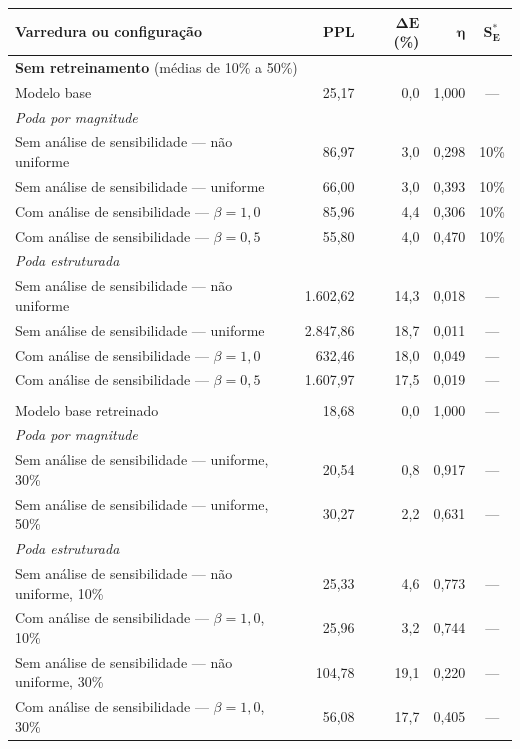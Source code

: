 \begin{tabular}{l r r r c}
\hline
\textbf{Varredura ou configuração} & \textbf{PPL} & $\boldsymbol{\Delta E}$ \textbf{(\%)} & $\boldsymbol{\eta}$ & $\boldsymbol{S^*_E}$ \\
\hline
\multicolumn{5}{l}{\textbf{Sem retreinamento} (médias de 10\% a 50\%)} \\
Modelo base & 25,17 & 0,0 & 1,000 & --- \\
\multicolumn{5}{l}{\quad\textit{Poda por magnitude}} \\
\qquad Sem análise de sensibilidade --- não uniforme & 86,97 & 3,0 & 0,298 & 10\% \\
\qquad Sem análise de sensibilidade --- uniforme & 66,00 & 3,0 & 0,393 & 10\% \\
\qquad Com análise de sensibilidade --- $\beta = 1{,}0$ & 85,96 & 4,4 & 0,306 & 10\% \\
\qquad Com análise de sensibilidade --- $\beta = 0{,}5$ & 55,80 & 4,0 & 0,470 & 10\% \\
\multicolumn{5}{l}{\quad\textit{Poda estruturada}} \\
\qquad Sem análise de sensibilidade --- não uniforme & 1.602,62 & 14,3 & 0,018 & --- \\
\qquad Sem análise de sensibilidade --- uniforme & 2.847,86 & 18,7 & 0,011 & --- \\
\qquad Com análise de sensibilidade --- $\beta = 1{,}0$ & 632,46 & 18,0 & 0,049 & --- \\
\qquad Com análise de sensibilidade --- $\beta = 0{,}5$ & 1.607,97 & 17,5 & 0,019 & --- \\
\addlinespace
\multicolumn{5}{l}{\textbf{Após o \textit{fine-tuning} de recuperação}} \\
Modelo base retreinado & 18,68 & 0,0 & 1,000 & --- \\
\multicolumn{5}{l}{\quad\textit{Poda por magnitude}} \\
\qquad Sem análise de sensibilidade --- uniforme, 30\% & 20,54 & 0,8 & 0,917 & --- \\
\qquad Sem análise de sensibilidade --- uniforme, 50\% & 30,27 & 2,2 & 0,631 & --- \\
\multicolumn{5}{l}{\quad\textit{Poda estruturada}} \\
\qquad Sem análise de sensibilidade --- não uniforme, 10\% & 25,33 & 4,6 & 0,773 & --- \\
\qquad Com análise de sensibilidade --- $\beta = 1{,}0$, 10\% & 25,96 & 3,2 & 0,744 & --- \\
\qquad Sem análise de sensibilidade --- não uniforme, 30\% & 104,78 & 19,1 & 0,220 & --- \\
\qquad Com análise de sensibilidade --- $\beta = 1{,}0$, 30\% & 56,08 & 17,7 & 0,405 & --- \\
\hline
\end{tabular}
